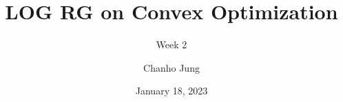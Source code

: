 \title{LOG RG on Convex Optimization}
\subtitle{Week 2}
\author{Chanho Jung}
\date{January 18, 2023} 
